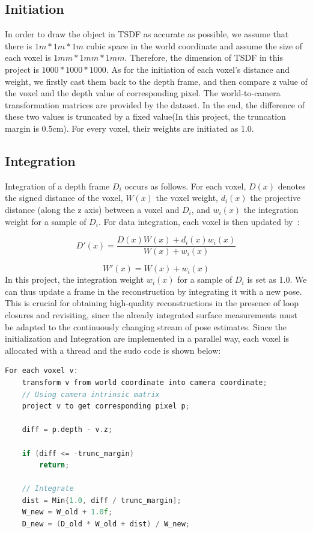 \documentclass{article}
\begin{document}
\subsection{Initiation}
In order to draw the object in TSDF as accurate as possible, we assume that there is \(1m * 1m * 1m \) cubic space in the world coordinate and assume the size of each voxel is \(1mm * 1mm * 1mm \). Therefore, the dimension of TSDF in this project is \(1000 * 1000 * 1000\). As for the initiation of each voxel's distance and weight, we firstly cast them back to the depth frame, and then compare z value of the voxel and the depth value of corresponding pixel. The world-to-camera transformation matrices are provided by the dataset. In the end, the difference of these two values is truncated by a fixed value(In this project, the truncation margin is 0.5cm). For every voxel, their weights are initiated as 1.0.

\subsection{Integration}
Integration of a depth frame $D_i$ occurs as follows. For each voxel, $D{(x)}$ denotes the signed distance of the voxel,  $W{(x)}$ the voxel weight, $d_i{(x)}$ the projective distance (along the z axis) between a voxel and $D_i$, and $w_i{(x)}$ the integration weight for a sample of $D_i$. For data integration, each voxel is then updated by~\cite{dai2017bundlefusion}:

\[D'(x)=\frac{D(x)W(x)+d_i{(x)}w_i{(x)}}{W(x)+w_i{(x)}}\]

\[W'(x)=W(x)+w_i{(x)}\]
In this project, the integration weight $w_i{(x)}$ for a sample of $D_i$ is set as 1.0. We can thus update a frame in the reconstruction by integrating it with a new pose. This is crucial for obtaining high-quality reconstructions in the presence of loop closures and revisiting, since the already integrated surface measurements must be adapted to the continuously changing stream of pose estimates. Since the initialization and Integration are implemented in a parallel way, each voxel is allocated with a thread and the sudo code is shown below:

\begin{lstlisting}[language=C++]
For each voxel v:
    transform v from world coordinate into camera coordinate;
    // Using camera intrinsic matrix
    project v to get corresponding pixel p;
    
    diff = p.depth - v.z;

    if (diff <= -trunc_margin)
    	return;
    
    // Integrate
    dist = Min{1.0, diff / trunc_margin];
    W_new = W_old + 1.0f;
    D_new = (D_old * W_old + dist) / W_new;

    
\end{lstlisting}
\end{document}
